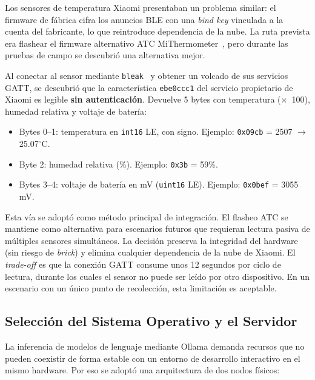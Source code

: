 Los sensores de temperatura Xiaomi presentaban un problema similar: el firmware de fábrica cifra los anuncios BLE con una \textit{bind key} vinculada a la cuenta del fabricante, lo que reintroduce dependencia de la nube. La ruta prevista era flashear el firmware alternativo ATC MiThermometer~\cite{pvvx_atc_mithermometer}, pero durante las pruebas de campo se descubrió una alternativa mejor.

Al conectar al sensor mediante \texttt{bleak}~\cite{bleak} y obtener un volcado de sus servicios GATT, se descubrió que la característica \texttt{ebe0ccc1} del servicio propietario de Xiaomi es legible \textbf{sin autenticación}. Devuelve 5 bytes con temperatura ($\times$~100), humedad relativa y voltaje de batería:

\begin{itemize}
    \item Bytes 0--1: temperatura en \texttt{int16} LE, con signo. Ejemplo: \texttt{0x09cb} = 2507 $\rightarrow$ 25.07$^\circ$C.
    \item Byte 2: humedad relativa (\%). Ejemplo: \texttt{0x3b} = 59\%.
    \item Bytes 3--4: voltaje de batería en mV (\texttt{uint16} LE). Ejemplo: \texttt{0x0bef} = 3055 mV.
\end{itemize}

Esta vía se adoptó como método principal de integración. El flasheo ATC se mantiene como alternativa para escenarios futuros que requieran lectura pasiva de múltiples sensores simultáneos. La decisión preserva la integridad del hardware (sin riesgo de \textit{brick}) y elimina cualquier dependencia de la nube de Xiaomi. El \textit{trade-off} es que la conexión GATT consume unos 12 segundos por ciclo de lectura, durante los cuales el sensor no puede ser leído por otro dispositivo. En un escenario con un único punto de recolección, esta limitación es aceptable.

\subsection{Selección del Sistema Operativo y el Servidor}

La inferencia de modelos de lenguaje mediante Ollama demanda recursos que no pueden coexistir de forma estable con un entorno de desarrollo interactivo en el mismo hardware. Por eso se adoptó una arquitectura de dos nodos físicos:

